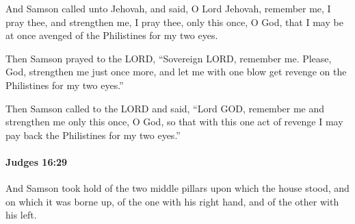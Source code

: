 			\begin{versebox}
					\item[BHS] 
					\item[ASV] And Samson called unto Jehovah, and said, O Lord Jehovah, remember me, I pray thee, and strengthen me, I pray thee, only this once, O God, that I may be at once avenged of the Philistines for my two eyes.
					\item[NIV] Then Samson prayed to the LORD, “Sovereign LORD, remember me. Please, God, strengthen me just once more, and let me with one blow get revenge on the Philistines for my two eyes.”
					\item[NRSV] Then Samson called to the LORD and said, “Lord GOD, remember me and strengthen me only this once, O God, so that with this one act of revenge I may pay back the Philistines for my two eyes.”
			\end{versebox}

		\paragraph{Judges 16:29} %
			\label{JUDGES-16-29}

			And Samson took hold of the two middle pillars upon which the house stood, and on which it was borne up, of the one with his right hand, and of the other with his left.

